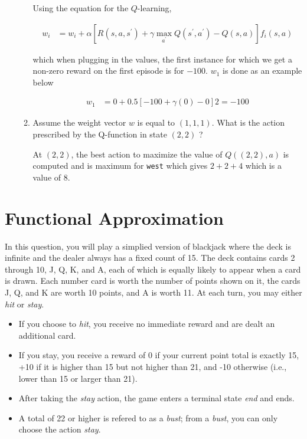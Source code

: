 \documentclass[12pt]{article}
\begin{document}
\begin{enumerate}
\begin{enumerate}
  Using the equation for the $Q$-learning,

  \begin{align*}
    w_{i} &= w_{i} + \alpha\left[R(s,a,s^{\prime}) + \gamma\max_{a^{\prime}}Q(s^{\prime},a^{\prime}) - Q(s,a)\right]f_{i}(s,a)
    \end{align*}

    which when plugging in the values, the first instance for which we get a non-zero reward on the first episode is for $-100$. $w_{1}$ is done as an example below

\begin{align*}
  w_{1} &= 0 + 0.5\left[ -100 + \gamma (0) - 0\right]2 = -100
\end{align*}

  \item Assume the weight vector $w$ is equal to $(1, 1, 1)$.  What is
  the action prescribed by the Q-function in state $(2,2)$ ?

At $(2,2)$, the best action to maximize the value of $Q((2,2),a)$ is computed and is maximum for {\tt west} which gives $2+2+4$ which is a value of $8$.

  \end{enumerate}

\end{enumerate}

\clearpage

\section{Functional Approximation}

In this question, you will play a simplied version of blackjack where
the deck is infinite and the dealer always has a fixed count of 15.
The deck contains cards 2 through 10, J, Q, K, and A, each of which is
equally likely to appear when a card is drawn.  Each number card is
worth the number of points shown on it, the cards J, Q, and K are
worth 10 points, and A is worth 11.  At each turn, you may either {\it
  hit} or {\it stay}.

\begin{itemize}

\item If you choose to {\it hit}, you receive no immediate reward and
  are dealt an additional card.  

\item If you stay, you receive a reward of 0 if your current point
  total is exactly 15, +10 if it is higher than 15 but not higher than
  21, and -10 otherwise (i.e., lower than 15 or larger than 21).

\item After taking the {\it stay} action, the game enters a terminal
  state {\it end} and ends.

\item A total of 22 or higher is refered to as a {\it bust}; from a
  {\it bust}, you can only choose the action {\it stay}.

\end{itemize}
\end{document}
